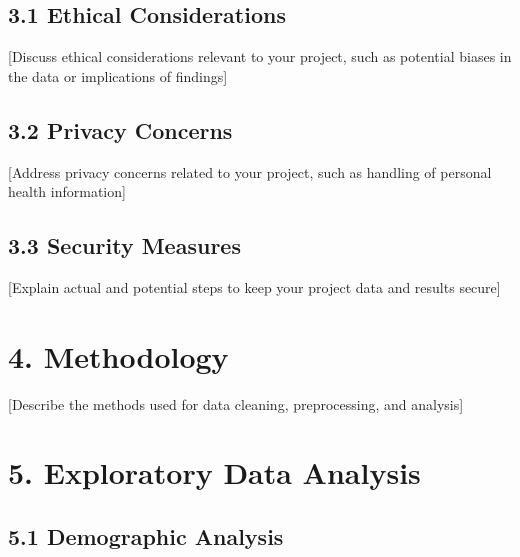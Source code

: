 \documentclass[
]{article}
\begin{document}
\hypertarget{ethical-considerations}{%
\subsection{3.1 Ethical Considerations}\label{ethical-considerations}}

{[}Discuss ethical considerations relevant to your project, such as
potential biases in the data or implications of findings{]}

\hypertarget{privacy-concerns}{%
\subsection{3.2 Privacy Concerns}\label{privacy-concerns}}

{[}Address privacy concerns related to your project, such as handling of
personal health information{]}

\hypertarget{security-measures}{%
\subsection{3.3 Security Measures}\label{security-measures}}

{[}Explain actual and potential steps to keep your project data and
results secure{]}

\hypertarget{methodology}{%
\section{4. Methodology}\label{methodology}}

{[}Describe the methods used for data cleaning, preprocessing, and
analysis{]}

\hypertarget{exploratory-data-analysis}{%
\section{5. Exploratory Data Analysis}\label{exploratory-data-analysis}}

\hypertarget{demographic-analysis}{%
\subsection{5.1 Demographic Analysis}\label{demographic-analysis}}
\end{document}
